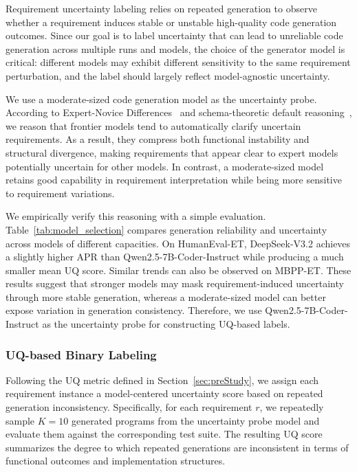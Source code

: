 Requirement uncertainty labeling relies on repeated generation to observe whether a requirement induces stable or unstable high-quality code generation outcomes. Since our goal is to label uncertainty that can lead to unreliable code generation across multiple runs and models, the choice of the generator model is critical: different models may exhibit different sensitivity to the same requirement perturbation, and the label should largely reflect model-agnostic uncertainty.

We use a moderate-sized code generation model as the uncertainty probe. According to Expert-Novice Differences~\cite{Chi1981ExpertNovice} and schema-theoretic default reasoning~\cite{Rumelhart1980Schemata}, we reason that frontier models tend to automatically clarify uncertain requirements. As a result, they compress both functional instability and structural divergence, making requirements that appear clear to expert models potentially uncertain for other models. In contrast, a moderate-sized model retains good capability in requirement interpretation while being more sensitive to requirement variations. 

We empirically verify this reasoning with a simple evaluation. Table~\ref{tab:model_selection} compares generation reliability and uncertainty across models of different capacities. On HumanEval-ET, DeepSeek-V3.2 achieves a slightly higher APR than Qwen2.5-7B-Coder-Instruct\cite{hui2024qwen2.5} while producing a much smaller mean UQ score. Similar trends can also be observed on MBPP-ET. These results suggest that stronger models may mask requirement-induced uncertainty through more stable generation, whereas a moderate-sized model can better expose variation in generation consistency. Therefore, we use Qwen2.5-7B-Coder-Instruct as the uncertainty probe for constructing UQ-based labels.



\subsubsection{UQ-based Binary Labeling}

Following the UQ metric defined in Section~\ref{sec:preStudy}, we assign each requirement instance a model-centered uncertainty score based on repeated generation inconsistency. Specifically, for each requirement $r$, we repeatedly sample $K=10$ generated programs from the uncertainty probe model and evaluate them against the corresponding test suite. The resulting UQ score summarizes the degree to which repeated generations are inconsistent in terms of functional outcomes and implementation structures.

